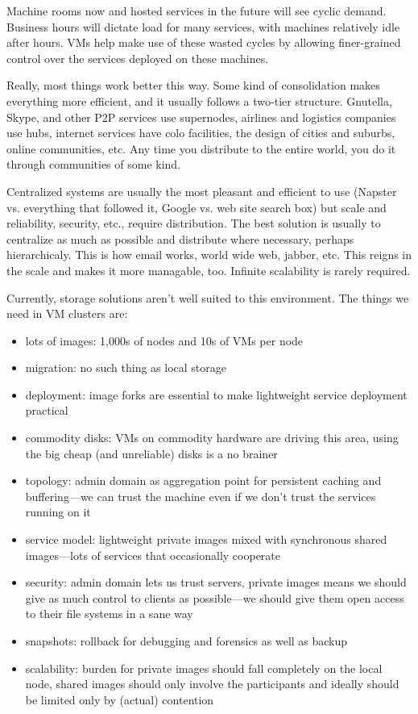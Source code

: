\documentclass[a4paper,12pt]{article}
\begin{document}
Machine rooms now and hosted services in the future will see cyclic demand. Business hours will dictate load for many services, with machines relatively idle after hours. VMs help make use of these wasted cycles by allowing finer-grained control over the services deployed on these machines.

Really, most things work better this way. Some kind of consolidation makes everything more efficient, and it usually follows a two-tier structure. Gnutella, Skype, and other P2P services use supernodes, airlines and logistics companies use hubs, internet services have colo facilities, the design of cities and suburbs, online communities, etc. Any time you distribute to the entire world, you do it through communities of some kind.

Centralized systems are usually the most pleasant and efficient to use (Napster vs. everything that followed it, Google vs. web site search box) but scale and reliability, security, etc., require distribution. The best solution is usually to centralize as much as possible and distribute where necessary, perhaps hierarchicaly. This is how email works, world wide web, jabber, etc. This reigns in the scale and makes it more managable, too. Infinite scalability is rarely required.

Currently, storage solutions aren't well suited to this environment. The things we need in VM clusters are:

\begin{itemize}
\item lots of images: 1,000s of nodes and 10s of VMs per node
\item migration: no such thing as local storage
\item deployment: image forks are essential to make lightweight service deployment practical
\item commodity disks: VMs on commodity hardware are driving this area, using the big cheap (and unreliable) disks is a no brainer
\item topology: admin domain as aggregation point for persistent caching and buffering---we can trust the machine even if we don't trust the services running on it
\item service model: lightweight private images mixed with synchronous shared images---lots of services that occasionally cooperate
\item security: admin domain lets us trust servers, private images means we should give as much control to clients as possible---we should give them open access to their file systems in a sane way
\item snapshots: rollback for debugging and forensics as well as backup
\item scalability: burden for private images should fall completely on the local node, shared images should only involve the participants and ideally should be limited only by (actual) contention
\end{itemize}
\end{document}
